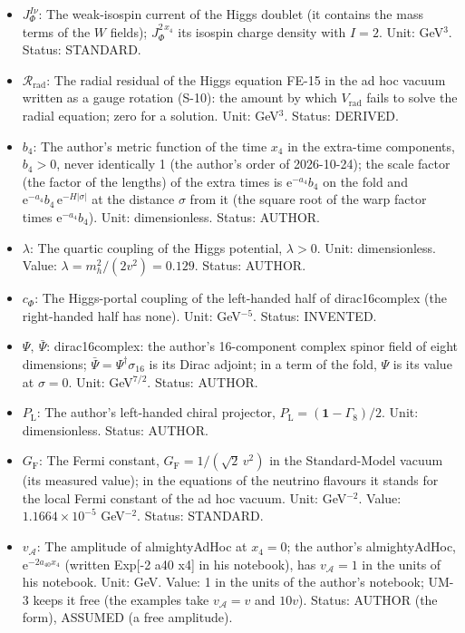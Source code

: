 \documentclass[
  10pt,
]{article}
\begin{document}
\begin{itemize}
  \(a_{40}\): The decay constant of almightyAdHoc, \(a_{40} > 0\):
  \(\mathcal{A}\) falls by \(\mathrm{e}\) in the time \(1/(2a_{40})\).
  Unit: GeV (1/length). Status: AUTHOR.
\item
  \(J_\Phi^{I\nu}\): The weak-isospin current of the Higgs doublet (it
  contains the mass terms of the \(W\) fields); \(J_\Phi^{2\,x_4}\) its
  isospin charge density with \(I = 2\). Unit: GeV\(^3\). Status:
  STANDARD.
\item
  \(\mathcal{R}_{\mathrm{rad}}\): The radial residual of the Higgs
  equation FE-15 in the ad hoc vacuum written as a gauge rotation
  (S-10): the amount by which \(V_{\mathrm{rad}}\) fails to solve the
  radial equation; zero for a solution. Unit: GeV\(^3\). Status:
  DERIVED.
\item
  \(b_4\): The author's metric function of the time \(x_4\) in the
  extra-time components, \(b_4 > 0\), never identically 1 (the author's
  order of 2026-10-24); the scale factor (the factor of the lengths) of
  the extra times is \(\mathrm{e}^{-a_4}b_4\) on the fold and
  \(\mathrm{e}^{-a_4}b_4\,\mathrm{e}^{-H\lvert\sigma\rvert}\) at the
  distance \(\sigma\) from it (the square root of the warp factor times
  \(\mathrm{e}^{-a_4}b_4\)). Unit: dimensionless. Status: AUTHOR.
\item
  \(\lambda\): The quartic coupling of the Higgs potential,
  \(\lambda > 0\). Unit: dimensionless. Value:
  \(\lambda = m_h^2/(2v^2) = 0.129\). Status: AUTHOR.
\item
  \(c_\Phi\): The Higgs-portal coupling of the left-handed half of
  dirac16complex (the right-handed half has none). Unit: GeV\(^{-5}\).
  Status: INVENTED.
\item
  \(\Psi,\ \bar\Psi\): dirac16complex: the author's 16-component complex
  spinor field of eight dimensions;
  \(\bar\Psi = \Psi^\dagger\sigma_{16}\) is its Dirac adjoint; in a term
  of the fold, \(\Psi\) is its value at \(\sigma = 0\). Unit:
  GeV\(^{7/2}\). Status: AUTHOR.
\item
  \(P_{\mathrm{L}}\): The author's left-handed chiral projector,
  \(P_{\mathrm{L}} = (\mathbf{1} - \Gamma_8)/2\). Unit: dimensionless.
  Status: AUTHOR.
\item
  \(G_{\mathrm{F}}\): The Fermi constant,
  \(G_{\mathrm{F}} = 1/(\sqrt2\,v^2)\) in the Standard-Model vacuum (its
  measured value); in the equations of the neutrino flavours it stands
  for the local Fermi constant of the ad hoc vacuum. Unit: GeV\(^{-2}\).
  Value: \(1.1664\times10^{-5}\) GeV\(^{-2}\). Status: STANDARD.
\item
  \(v_{\mathcal{A}}\): The amplitude of almightyAdHoc at \(x_4 = 0\);
  the author's almightyAdHoc, \(\mathrm{e}^{-2a_{40}x_4}\) (written
  Exp{[}-2 a40 x4{]} in his notebook), has \(v_{\mathcal{A}} = 1\) in
  the units of his notebook. Unit: GeV. Value: 1 in the units of the
  author's notebook; UM-3 keeps it free (the examples take
  \(v_{\mathcal{A}} = v\) and \(10v\)). Status: AUTHOR (the form),
  ASSUMED (a free amplitude).
\end{itemize}
\end{document}
